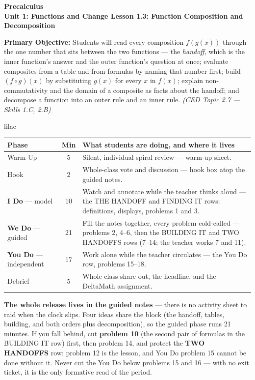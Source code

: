 \documentclass[10pt]{article}
\newcommand{\CourseName}{Precalculus}
\newcommand{\UnitNumberName}{Unit 1: Functions and Change \quad}
\newcommand{\LessonNumberName}{Lesson 1.3: Function Composition and Decomposition}
\begin{document}
\begin{center}
    {\Large\bfseries \CourseName \\
    {\small\bfseries \UnitNumberName \LessonNumberName}}
\end{center}

\begin{tcolorbox}[colback=lilac, colframe=plum, boxrule=0.9pt, arc=2mm,
    left=2mm, right=2mm, top=1.5mm, bottom=1.5mm]
    \textbf{Primary Objective:} Students will read every composition $f(g(x))$
    through the one number that sits between the two functions --- the
    \textit{handoff}, which is the inner function's answer and the outer
    function's question at once; evaluate composites from a table and from
    formulas by naming that number first; build $(f \circ g)(x)$ by substituting
    $g(x)$ for every $x$ in $f(x)$; explain non-commutativity and the domain of a
    composite as facts about the handoff; and decompose a function into an outer
    rule and an inner rule.
    \hfill\textit{\small (CED Topic 2.7 --- Skills 1.C, 2.B)}
\end{tcolorbox}

\boxguard[22]
\begin{skillbox}{lilac}
\small
\renewcommand{\arraystretch}{1.25}
\begin{tabularx}{\linewidth}{@{} l c X @{}}
\textbf{Phase} & \textbf{Min} & \textbf{What students are doing, and where it lives} \\
\midrule
Warm-Up                       & 5  & Silent, individual spiral review --- warm-up sheet. \\
Hook                          & 2  & Whole-class vote and discussion --- hook box atop the guided notes. \\
\textbf{I Do} --- model       & 10 & Watch and annotate while the teacher thinks aloud --- the THE HANDOFF and FINDING IT rows: definitions, displays, problems 1 and 3. \\
\textbf{We Do} --- guided     & 21 & Fill the notes together, every problem cold-called --- problems 2, 4--6, then the BUILDING IT and TWO HANDOFFS rows (7--14; the teacher works 7 and 11). \\
\textbf{You Do} --- independent & 17 & Work alone while the teacher circulates --- the You Do row, problems 15--18. \\
Debrief                       & 5  & Whole-class share-out, the headline, and the DeltaMath assignment. \\
\end{tabularx}

\smallskip
\textbf{The whole release lives in the guided notes} --- there is no activity sheet to raid when
the clock slips. Four ideas share the block (the handoff, tables, building, and both orders plus
decomposition), so the guided phase runs 21 minutes. If you fall behind, cut \textbf{problem 10}
(the second pair of formulas in the BUILDING IT row) first, then problem 14, and protect the
\textbf{TWO HANDOFFS} row: problem 12 is the lesson, and You Do problem 15 cannot be done
without it. Never cut the You Do below problems 15 and 16 --- with no exit ticket, it is the
only formative read of the period.
\end{skillbox}
\end{document}
